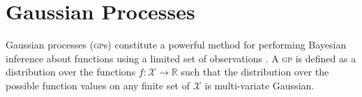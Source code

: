 \documentclass{article}
\newcommand\jansays[1]{\textcolor{blue}{Jan says: #1}}
\begin{document}


\section{Gaussian Processes}

Gaussian processes ({\scshape gp}s) constitute a powerful method for performing Bayesian inference about functions using a limited set of observations \cite{rassandwill}. A {\scshape gp} is defined as a distribution over the functions $f : \mathcal{X} \rightarrow \mathbb{R}$ such that the distribution over the possible function values on any finite set of $\mathcal{X}$ is multi-variate Gaussian.
\end{document}
